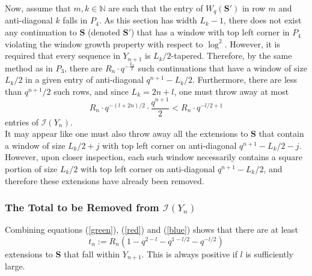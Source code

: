 \documentclass{article}
\theoremstyle{definition}
\newcommand{\N}{\mathbb{N}}
\numberwithin{equation}{subsection}
\begin{document}
\noindent Now, assume that $m,k\in\N$ are such that the entry of $W_q(\mathbf{S}')$ in row $m$ and anti-diagonal $k$ falls in $P_4$. As this section has width $L_k-1$, there does not exist any continuation to $\mathbf{S}$ (denoted $\mathbf{S}'$) that has a window with top left corner in $P_4$ violating the window growth property with respect to $\log^2$. However, it is required that every sequence in $Y_{n+1}$ is $L_k/2$-tapered. Therefore, by the same method as in $P_3$, there are $R_n\cdot q^{-\frac{L_k}{2}}$ such continuations that have a window of size $L_k/2$ in a given entry of anti-diagonal $q^{n+1}-L_k/2$. Furthermore, there are less than $q^{n+1}/2$ such rows, and since $L_k=2n+l$, one must throw away at most \begin{equation}\label{red}
    R_n\cdot q^{-(l+2n)/2}\cdot \frac{q^{n+1}}{2}<R_n\cdot q^{-l/2+1}
\end{equation}
entries of $\mathcal{I}(Y_n)$.\\

\noindent It may appear like one must also throw away all the extensions to $\mathbf{S}$ that contain a window of size $L_k/2+j$ with top left corner on anti-diagonal $q^{n+1}-L_k/2-j$. However, upon closer inspection, each such window necessarily contains a square portion of size $L_k/2$ with top left corner on anti-diagonal $q^{n+1}-L_k/2$, and therefore these extensions have already been removed.

\subsubsection*{The Total to be Removed from $\mathcal{I}(Y_n)$}

\noindent Combining equations (\ref{green}), (\ref{red}) and (\ref{blue}) shows that there are at least \begin{equation}t_n:=R_n\left(1-q^{2-l}-q^{1-l/2}-q^{-l/2}\right)\label{tn}\end{equation}extensions to $\textbf{S}$ that fall within $Y_{n+1}$. This is always positive if $l$ is sufficiently large. 
\end{document}
